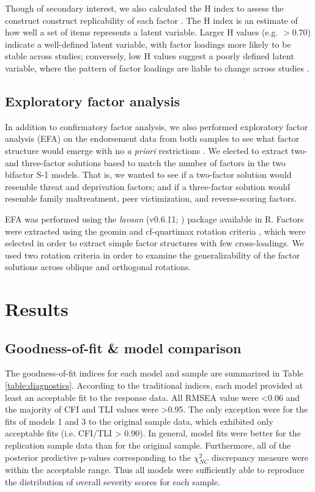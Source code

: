 \documentclass[letterpaper,man,natbib]{apa6}  %
\begin{document}
Though of secondary interest, we also calculated the H index to assess the construct construct replicability of each factor \citep{hancock2001rethinking}. The H index is an estimate of how well a set of items represents a latent variable. Larger H values (e.g. $> 0.70$) indicate a well-defined latent variable, with factor loadings more likely to be stable across studies; conversely, low H values suggest a poorly defined latent variable, where the pattern of factor loadings are liable to change across studies \citep{hancock2001rethinking}.

\subsection{Exploratory factor analysis}

In addition to confirmatory factor analysis, we also performed exploratory factor analysis (EFA) on the endorsement data from both samples to see what factor structure would emerge with no \emph{a priori} restrictions \citep{schmitt2018selecting}. We elected to extract two- and three-factor solutions based to match the number of factors in the two bifactor S-1 models. That is, we wanted to see if a two-factor solution would resemble threat and deprivation factors; and if a three-factor solution would resemble family maltreatment, peer victimization, and reverse-scoring factors. 

EFA was performed using the \textit{lavaan} (v0.6.11; \citealt{lavaan}) package available in R. Factors were extracted using the geomin \citep{yates1987multivariate} and cf-quartimax rotation criteria \citep{crawford1970general}, which were selected in order to extract simple factor structures with few cross-loadings. We used two rotation criteria in order to examine the generalizability of the factor solutions across oblique and orthogonal rotations. 

\section{Results}

\subsection{Goodness-of-fit \& model comparison}

The goodness-of-fit indices for each model and sample are summarized in Table \ref{table:diagnostics}. According to the traditional indices, each model provided at least an acceptable fit to the response data. All RMSEA value were <0.06 and the majority of CFI and TLI values were >0.95. The only exception were for the fits of models 1 and 3 to the original sample data, which exhibited only acceptable fits (i.e. CFI/TLI > 0.90). In general, model fits were better for the replication sample data than for the original sample. Furthermore, all of the posterior predictive p-values corresponding to the $\chi^2_{NC}$ discrepancy measure were within the acceptable range. Thus all models were sufficiently able to reproduce the distribution of overall severity scores for each sample.
\end{document}
